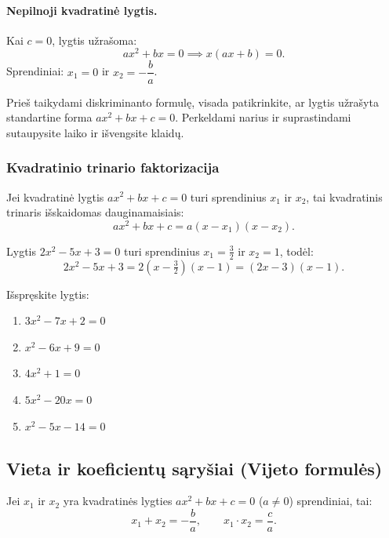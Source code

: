 \paragraph{Nepilnoji kvadratinė lygtis.}
Kai $c = 0$, lygtis užrašoma:
\[
ax^2 + bx = 0 \implies x(ax + b) = 0.
\]
Sprendiniai: $x_1 = 0$ ir $x_2 = -\dfrac{b}{a}$.

\begin{tcolorbox}[title={VBE patarimas}]
Prieš taikydami diskriminanto formulę, visada patikrinkite, ar lygtis užrašyta standartine forma $ax^2 + bx + c = 0$. Perkeldami narius ir suprastindami sutaupysite laiko ir išvengsite klaidų.
\end{tcolorbox}

\subsubsection*{Kvadratinio trinario faktorizacija}

Jei kvadratinė lygtis $ax^2 + bx + c = 0$ turi sprendinius $x_1$ ir $x_2$, tai kvadratinis trinaris išskaidomas dauginamaisiais:
\[
ax^2 + bx + c = a(x - x_1)(x - x_2).
\]

\begin{example}
Lygtis $2x^2 - 5x + 3 = 0$ turi sprendinius $x_1 = \frac{3}{2}$ ir $x_2 = 1$, todėl:
\[
2x^2 - 5x + 3 = 2\!\left(x - \tfrac{3}{2}\right)(x - 1) = (2x - 3)(x - 1).
\]
\end{example}

\begin{exercise}
Išspręskite lygtis:
\begin{enumerate}[label=\alph*)]
    \item $3x^2 - 7x + 2 = 0$
    \item $x^2 - 6x + 9 = 0$
    \item $4x^2 + 1 = 0$
    \item $5x^2 - 20x = 0$
    \item $x^2 - 5x - 14 = 0$
\end{enumerate}
\end{exercise}

\subsection{Vieta ir koeficientų sąryšiai (Vijeto formulės)}

\begin{theorem}
Jei $x_1$ ir $x_2$ yra kvadratinės lygties $ax^2 + bx + c = 0$ ($a \neq 0$) sprendiniai, tai:
\[
x_1 + x_2 = -\frac{b}{a}, \qquad x_1 \cdot x_2 = \frac{c}{a}.
\]
\end{theorem}

